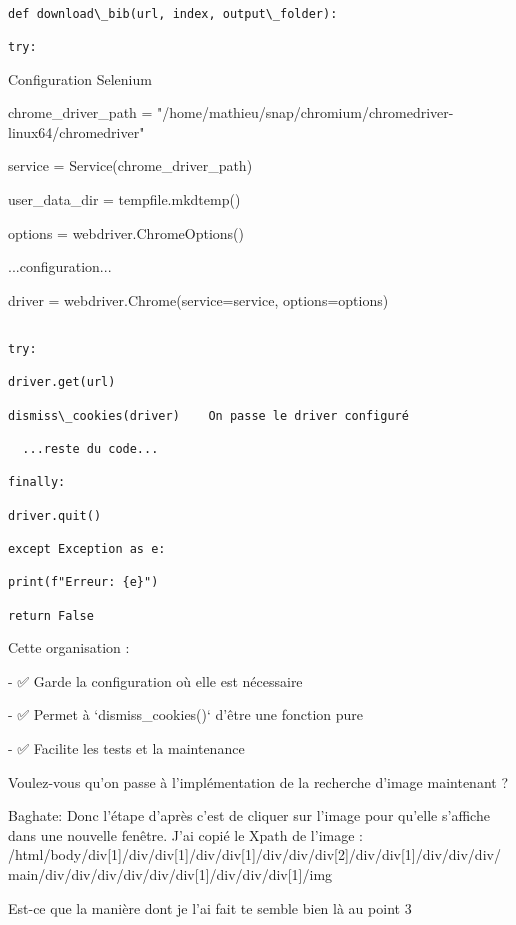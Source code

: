 \begin{verbatim}

def download\_bib(url, index, output\_folder):

try:

\end{verbatim}

  Configuration Selenium

chrome\_driver\_path = "/home/mathieu/snap/chromium/chromedriver-linux64/chromedriver"

service = Service(chrome\_driver\_path)

user\_data\_dir = tempfile.mkdtemp()

options = webdriver.ChromeOptions()

  ...configuration...

driver = webdriver.Chrome(service=service, options=options)

\begin{verbatim}

try:

driver.get(url)

dismiss\_cookies(driver)    On passe le driver configuré

  ...reste du code...

finally:

driver.quit()

except Exception as e:

print(f"Erreur: {e}")

return False

\end{verbatim}

Cette organisation :

- ✅ Garde la configuration où elle est nécessaire

- ✅ Permet à `dismiss\_cookies()` d'être une fonction pure

- ✅ Facilite les tests et la maintenance

Voulez-vous qu'on passe à l'implémentation de la recherche d'image maintenant ?

Baghate: Donc l'étape d'après c'est de cliquer sur l'image pour qu'elle s'affiche dans une nouvelle fenêtre. J'ai copié le Xpath de l'image : /html/body/div[1]/div/div[1]/div/div[1]/div/div/div[2]/div/div[1]/div/div/div/main/div/div/div/div/div/div[1]/div/div/div[1]/img

Est-ce que la manière dont je l'ai fait te semble bien là au point   3

